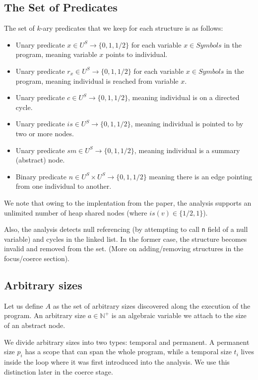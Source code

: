 \subsection*{The Set of Predicates}
The set of $k$-ary predicates that we keep for each structure is as follows:
\begin{itemize}
	\item Unary predicate $x\in U^S\to \{0,1,1/2\}$ for each variable $x\in Symbols$ in the program, meaning variable $x$ points to individual.
	\item Unary predicate $r_x\in U^S\to \{0,1,1/2\}$ for each variable $x\in Symbols$ in the program, meaning individual is reached from variable $x$.
	\item Unary predicate $c\in U^S\to \{0,1,1/2\}$, meaning individual is on a directed cycle.
	\item Unary predicate $is\in U^S\to \{0,1,1/2\}$, meaning individual is pointed to by two or more nodes.
	\item Unary predicate $sm\in U^S\to \{0,1,1/2\}$, meaning individual is a summary (abstract) node.
	\item Binary predicate $n\in U^S\times U^S\to \{0,1,1/2\}$ meaning there is an edge pointing from one individual to another.
\end{itemize}
We note that owing to the implentation from the paper, the analysis supports an unlimited number of heap shared nodes (where $is(v)\in\{1/2,1\}$).

Also, the analysis detects null referencing (by attempting to call \texttt{n} field of a null variable) and cycles in the linked list. In the former case, the structure becomes invalid and removed from the set. (More on adding/removing structures in the focus/coerce section). 

\subsection*{Arbitrary sizes}
Let us define $A$ as the set of arbitrary sizes discovered along the execution of the program. An arbitrary size $a\in\mathbb{N}^+$ is an algebraic variable we attach to the size of an abstract node.

We divide arbitrary sizes into two types: temporal and permanent. A permanent size $p_i$ has a scope that can span the whole program, while a temporal size $t_i$ lives inside the loop where it was first introduced into the analysis. We use this distinction later in the coerce stage.

